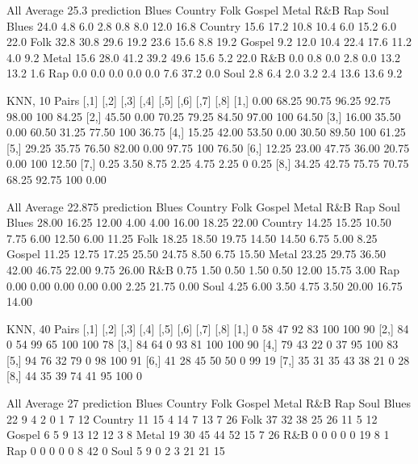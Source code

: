 \documentclass[a4paper,oneside]{article}
\begin{document}
All
Average 25.3
prediction Blues Country Folk Gospel Metal  R\&B  Rap Soul
   Blues    24.0     4.8  6.0    2.8   0.8  8.0 12.0 16.8
   Country  15.6    17.2 10.8   10.4   6.0 15.2  6.0 22.0
   Folk     32.8    30.8 29.6   19.2  23.6 15.6  8.8 19.2
   Gospel    9.2    12.0 10.4   22.4  17.6 11.2  4.0  9.2
   Metal    15.6    28.0 41.2   39.2  49.6 15.6  5.2 22.0
   R\&B       0.0     0.8  0.0    2.8   0.0 13.2 13.2  1.6
   Rap       0.0     0.0  0.0    0.0   0.0  7.6 37.2  0.0
   Soul      2.8     6.4  2.0    3.2   2.4 13.6 13.6  9.2

KNN, 10
Pairs
      [,1]  [,2]  [,3]  [,4]  [,5]  [,6] [,7]  [,8]
[1,]  0.00 68.25 90.75 96.25 92.75 98.00  100 84.25
[2,] 45.50  0.00 70.25 79.25 84.50 97.00  100 64.50
[3,] 16.00 35.50  0.00 60.50 31.25 77.50  100 36.75
[4,] 15.25 42.00 53.50  0.00 30.50 89.50  100 61.25
[5,] 29.25 35.75 76.50 82.00  0.00 97.75  100 76.50
[6,] 12.25 23.00 47.75 36.00 20.75  0.00  100 12.50
[7,]  0.25  3.50  8.75  2.25  4.75  2.25    0  0.25
[8,] 34.25 42.75 75.75 70.75 68.25 92.75  100  0.00

All
Average 22.875
prediction Blues Country  Folk Gospel Metal   R\&B   Rap  Soul
   Blues   28.00   16.25 12.00   4.00  4.00 16.00 18.25 22.00
   Country 14.25   15.25 10.50   7.75  6.00 12.50  6.00 11.25
   Folk    18.25   18.50 19.75  14.50 14.50  6.75  5.00  8.25
   Gospel  11.25   12.75 17.25  25.50 24.75  8.50  6.75 15.50
   Metal   23.25   29.75 36.50  42.00 46.75 22.00  9.75 26.00
   R\&B      0.75    1.50  0.50   1.50  0.50 12.00 15.75  3.00
   Rap      0.00    0.00  0.00   0.00  0.00  2.25 21.75  0.00
   Soul     4.25    6.00  3.50   4.75  3.50 20.00 16.75 14.00

KNN, 40
Pairs
     [,1] [,2] [,3] [,4] [,5] [,6] [,7] [,8]
[1,]    0   58   47   92   83  100  100   90
[2,]   84    0   54   99   65  100  100   78
[3,]   84   64    0   93   81  100  100   90
[4,]   79   43   22    0   37   95  100   83
[5,]   94   76   32   79    0   98  100   91
[6,]   41   28   45   50   50    0   99   19
[7,]   35   31   35   43   38   21    0   28
[8,]   44   35   39   74   41   95  100    0

All
Average 27
prediction Blues Country Folk Gospel Metal R\&B Rap Soul
   Blues      22       9    4      2     0   1   7   12
   Country    11      15    4     14     7  13   7   26
   Folk       37      32   38     25    26  11   5   12
   Gospel      6       5    9     13    12  12   3    8
   Metal      19      30   45     44    52  15   7   26
   R\&B         0       0    0      0     0  19   8    1
   Rap         0       0    0      0     0   8  42    0
   Soul        5       9    0      2     3  21  21   15
\end{document}
